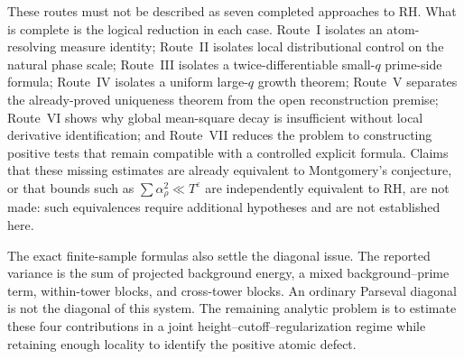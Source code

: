 \documentclass[11pt]{amsart}
\numberwithin{equation}{section}
\theoremstyle{plain}
\theoremstyle{definition}
\theoremstyle{remark}
\newcommand{\1}{\mathbf{1}}
\begin{document}
These routes must not be described as seven completed approaches to RH.  What
is complete is the logical reduction in each case.  Route~I isolates an
atom-resolving measure identity; Route~II isolates local distributional
control on the natural phase scale; Route~III isolates a twice-differentiable
small-\(q\) prime-side formula; Route~IV isolates a uniform large-\(q\)
growth theorem; Route~V separates the already-proved uniqueness theorem from
the open reconstruction premise; Route~VI shows why global mean-square decay
is insufficient without local derivative identification; and Route~VII
reduces the problem to constructing positive tests that remain compatible
with a controlled explicit formula.  Claims that these missing estimates are
already equivalent to Montgomery's conjecture, or that bounds such as
\(\sum\alpha_\rho^2\ll T^\varepsilon\) are independently equivalent to
RH, are not made: such equivalences require additional hypotheses and are not
established here.

The exact finite-sample formulas also settle the diagonal issue.  The reported
variance is the sum of projected background energy, a mixed
background--prime term, within-tower blocks, and cross-tower blocks.  An
ordinary Parseval diagonal is not the diagonal of this system.  The remaining
analytic problem is to estimate these four contributions in a joint
height--cutoff--regularization regime while retaining enough locality to
identify the positive atomic defect.
\end{document}
